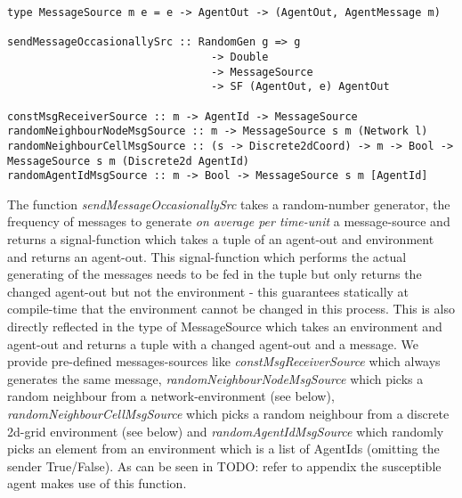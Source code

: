 \begin{verbatim}
type MessageSource m e = e -> AgentOut -> (AgentOut, AgentMessage m)

sendMessageOccasionallySrc :: RandomGen g => g 
                                -> Double
                                -> MessageSource  
                                -> SF (AgentOut, e) AgentOut

constMsgReceiverSource :: m -> AgentId -> MessageSource 
randomNeighbourNodeMsgSource :: m -> MessageSource s m (Network l)
randomNeighbourCellMsgSource :: (s -> Discrete2dCoord) -> m -> Bool -> MessageSource s m (Discrete2d AgentId)
randomAgentIdMsgSource :: m -> Bool -> MessageSource s m [AgentId]
\end{verbatim}

The function \textit{sendMessageOccasionallySrc} takes a random-number generator, the frequency of messages to generate \textit{on average per time-unit} a message-source and returns a signal-function which takes a tuple of an agent-out and environment and returns an agent-out. This signal-function which performs the actual generating of the messages needs to be fed in the tuple but only returns the changed agent-out but not the environment - this guarantees statically at compile-time that the environment cannot be changed in this process. This is also directly reflected in the type of MessageSource which takes an environment and agent-out and returns a tuple with a changed agent-out and a message. We provide pre-defined messages-sources like \textit{constMsgReceiverSource} which always generates the same message, \textit{randomNeighbourNodeMsgSource} which picks a random neighbour from a network-environment (see below), \textit{randomNeighbourCellMsgSource} which picks a random neighbour from a discrete 2d-grid environment (see below) and \textit{randomAgentIdMsgSource} which randomly picks an element from an environment which is a list of AgentIds (omitting the sender True/False).
As can be seen in TODO: refer to appendix the susceptible agent makes use of this function.

